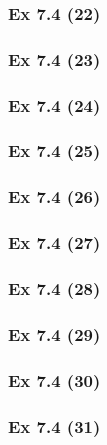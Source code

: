 \subsubsection{Ex 7.4 (22)}\label{sec:Ex_7.4.22}

\subsubsection{Ex 7.4 (23)}\label{sec:Ex_7.4.23}

\subsubsection{Ex 7.4 (24)}\label{sec:Ex_7.4.24}

\subsubsection{Ex 7.4 (25)}\label{sec:Ex_7.4.25}

\subsubsection{Ex 7.4 (26)}\label{sec:Ex_7.4.26}

\subsubsection{Ex 7.4 (27)}\label{sec:Ex_7.4.27}

\subsubsection{Ex 7.4 (28)}\label{sec:Ex_7.4.28}

\subsubsection{Ex 7.4 (29)}\label{sec:Ex_7.4.29}

\subsubsection{Ex 7.4 (30)}\label{sec:Ex_7.4.30}

\newpage		%

\subsubsection{Ex 7.4 (31)}\label{sec:Ex_7.4.31}

